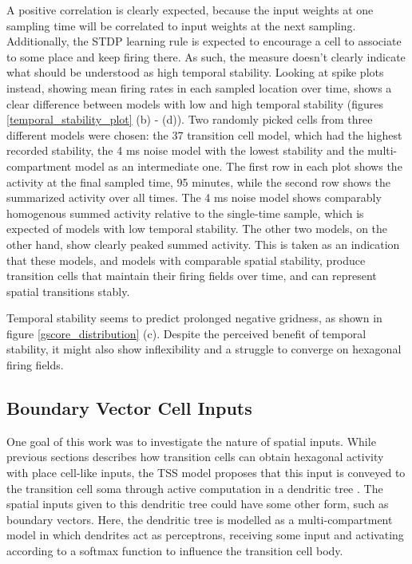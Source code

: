 \documentclass{article}
\begin{document}
    A positive correlation is clearly expected, because the input weights at one sampling time will be correlated to input weights at the next sampling. Additionally, the STDP learning rule is expected to encourage a cell to associate to some place and keep firing there. As such, the measure doesn't clearly indicate what should be understood as high temporal stability. Looking at spike plots instead, showing mean firing rates in each sampled location over time, shows a clear difference between models with low and high temporal stability (figures \ref{temporal_stability_plot} (b) - (d)). Two randomly picked cells from three different models were chosen: the 37 transition cell model, which had the highest recorded stability, the 4 ms noise model with the lowest stability and the multi-compartment model as an intermediate one. The first row in each plot shows the activity at the final sampled time, 95 minutes, while the second row shows the summarized activity over all times. The 4 ms noise model shows comparably homogenous summed activity relative to the single-time sample, which is expected of models with low temporal stability. The other two models, on the other hand, show clearly peaked summed activity. This is taken as an indication that these models, and models with comparable spatial stability, produce transition cells that maintain their firing fields over time, and can represent spatial transitions stably.

    Temporal stability seems to predict prolonged negative gridness, as shown in figure \ref{gscore_distribution} (c). Despite the perceived benefit of temporal stability, it might also show inflexibility and a struggle to converge on hexagonal firing fields.


    \subsection{Boundary Vector Cell Inputs} \label{MCModResult}
    One goal of this work was to investigate the nature of spatial inputs. While previous sections describes how transition cells can obtain hexagonal activity with place cell-like inputs, the TSS model proposes that this input is conveyed to the transition cell soma through active computation in a dendritic tree \parencite{Waniek2020}. The spatial inputs given to this dendritic tree could have some other form, such as boundary vectors. Here, the dendritic tree is modelled as a multi-compartment model in which dendrites act as perceptrons, receiving some input and activating according to a softmax function to influence the transition cell body.
\end{document}
